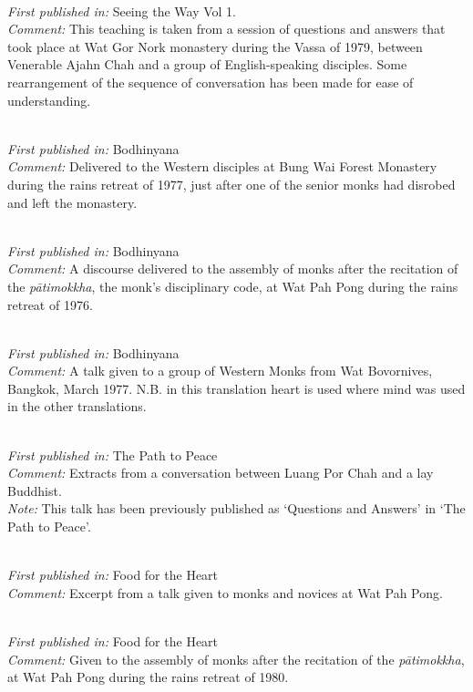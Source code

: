 { \\
\textit{First published in:} Seeing the Way Vol 1. \\
\textit{Comment:} This teaching is taken from a session of questions and answers that took place at Wat Gor Nork monastery during the Vassa of 1979, between Venerable Ajahn Chah and a group of English-speaking disciples. Some rearrangement of the sequence of conversation has been made for ease of understanding.

 \\
\textit{First published in:} Bodhinyana \\
\textit{Comment:} Delivered to the Western disciples at Bung Wai Forest Monastery during the rains retreat of 1977, just after one of the senior monks had disrobed and left the monastery.

 \\
\textit{First published in:} Bodhinyana \\
\textit{Comment:} A discourse delivered to the assembly of monks after the recitation of the \textit{p\=ati\-mokkha}, the monk's disciplinary code, at Wat Pah Pong during the rains retreat of 1976.

 \\
\textit{First published in:} Bodhinyana \\
\textit{Comment:} A talk given to a group of Western Monks from Wat Bovornives, Bangkok, March 1977. N.B. in this translation heart is used where mind was used in the other translations.

 \\
\textit{First published in:} The Path to Peace \\
\textit{Comment:} Extracts from a conversation between Luang Por Chah and a lay Buddhist. \\
\textit{Note:} This talk has been previously published as `Questions and Answers' in `The Path to Peace'.

 \\
\textit{First published in:} Food for the Heart \\
\textit{Comment:} Excerpt from a talk given to monks and novices at Wat Pah Pong.

 \\
\textit{First published in:} Food for the Heart \\
\textit{Comment:} Given to the assembly of monks after the recitation of the \textit{p\=ati\-mokkha}, at Wat Pah Pong during the rains retreat of 1980.

}
